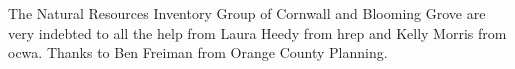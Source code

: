 The Natural Resources Inventory Group of Cornwall and Blooming Grove are very indebted to all the help from Laura Heedy from \gls{hrep} and Kelly Morris from \gls{ocwa}. Thanks to Ben Freiman from Orange County Planning.
